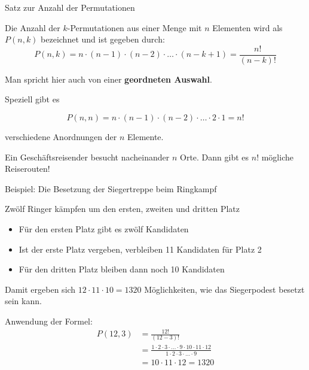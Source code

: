\documentclass[12pt,ngerman,a4paper,ignorenonframetext,]{beamer}
\begin{document}
\begin{frame}{Satz zur Anzahl der Permutationen}
\protect\hypertarget{satz-zur-anzahl-der-permutationen}{}


\begin{Satz}

Die Anzahl der \(k\)-Permutationen aus einer Menge mit \(n\) Elementen
wird als \(P(n,k)\) bezeichnet und ist gegeben durch: \begin{equation*} 
    P(n,k)  = n \cdot (n-1) \cdot (n-2) \cdot \dots \cdot (n-k+1)   
            = \frac{n!}{(n-k)!} 
\end{equation*}

Man spricht hier auch von einer \textbf{geordneten Auswahl}.

Speziell gibt es

\begin{equation*} 
    P(n,n)  = n \cdot (n-1) \cdot (n-2) \cdot \dots \cdot 2 \cdot 1   
            = n! 
\end{equation*}

verschiedene Anordnungen der \(n\) Elemente.

\end{Satz}


\begin{Beispiel}

Ein Geschäftsreisender besucht nacheinander \(n\) Orte. Dann gibt es
\(n!\) mögliche Reiserouten!

\end{Beispiel}

\end{frame}

\begin{frame}{Beispiel: Die Besetzung der Siegertreppe beim Ringkampf}
\protect\hypertarget{beispiel-die-besetzung-der-siegertreppe-beim-ringkampf}{}

Zwölf Ringer kämpfen um den ersten, zweiten und dritten Platz

\begin{itemize}
\item
  Für den ersten Platz gibt es zwölf Kandidaten
\item
  Ist der erste Platz vergeben, verbleiben 11 Kandidaten für Platz 2
\item
  Für den dritten Platz bleiben dann noch 10 Kandidaten
\end{itemize}

Damit ergeben sich \(12 \cdot 11 \cdot 10 = 1320\) Möglichkeiten, wie
das Siegerpodest besetzt sein kann.

Anwendung der Formel: \begin{align*}
    P(12,3) &= \frac{12!}{(12-3)!} \\ 
            &= \frac{1 \cdot 2 \cdot 3 \cdot \dots \cdot 9 \cdot 10 \cdot 11 \cdot 12}{1 \cdot 2 \cdot 3 \cdot \dots \cdot 9} \\
            &= 10 \cdot 11 \cdot 12 = 1320
\end{align*}

\end{frame}
\end{document}
